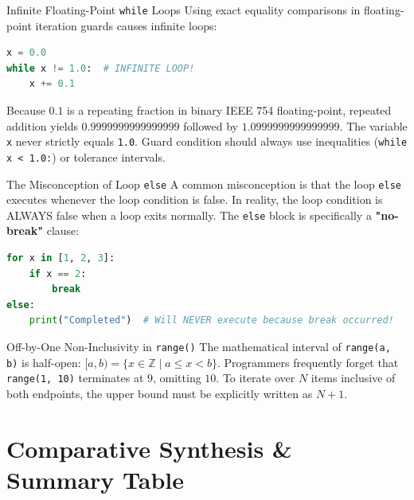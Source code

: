 \begin{trapbox}{Infinite Floating-Point \texttt{while} Loops}
Using exact equality comparisons in floating-point iteration guards causes infinite loops:
\begin{lstlisting}[language=Python]
x = 0.0
while x != 1.0:  # INFINITE LOOP!
    x += 0.1
\end{lstlisting}
Because $0.1$ is a repeating fraction in binary IEEE 754 floating-point, repeated addition yields $0.9999999999999999$ followed by $1.0999999999999999$. The variable \texttt{x} never strictly equals \texttt{1.0}. Guard condition should always use inequalities (\texttt{while x < 1.0:}) or tolerance intervals.
\end{trapbox}

\begin{trapbox}{The Misconception of Loop \texttt{else}}
A common misconception is that the loop \texttt{else} executes whenever the loop condition is false. In reality, the loop condition is ALWAYS false when a loop exits normally. The \texttt{else} block is specifically a \textbf{"no-break"} clause:
\begin{lstlisting}[language=Python]
for x in [1, 2, 3]:
    if x == 2:
        break
else:
    print("Completed")  # Will NEVER execute because break occurred!
\end{lstlisting}
\end{trapbox}

\begin{trapbox}{Off-by-One Non-Inclusivity in \texttt{range()}}
The mathematical interval of \texttt{range(a, b)} is half-open: $[a, b) = \{x \in \mathbb{Z} \mid a \le x < b\}$.
Programmers frequently forget that \texttt{range(1, 10)} terminates at $9$, omitting $10$. To iterate over $N$ items inclusive of both endpoints, the upper bound must be explicitly written as $N + 1$.
\end{trapbox}

\section{Comparative Synthesis \& Summary Table}

